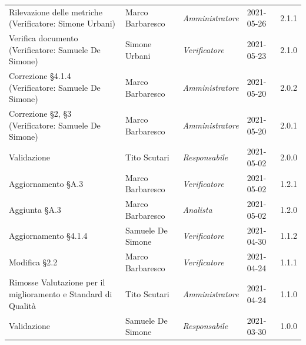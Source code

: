 \documentclass[a4paper]{article}
\begin{document}
\begin{center}
\begin{longtable}[!h]{p{160px} p{80px} p{70px} p{55px} p{40px}}
        Rilevazione delle metriche \newline (Verificatore: Simone Urbani)                         & Marco Barbaresco  & \textit{Amministratore} & 2021-05-26    & 2.1.1             \\
        Verifica documento \newline (Verificatore: Samuele De Simone)                             & Simone Urbani     & \textit{Verificatore}   & 2021-05-23    & 2.1.0             \\
        Correzione \S 4.1.4 \newline (Verificatore: Samuele De Simone)                            & Marco Barbaresco  & \textit{Amministratore} & 2021-05-20    & 2.0.2             \\
        Correzione \S2, \S3 \newline (Verificatore: Samuele De Simone)                            & Marco Barbaresco  & \textit{Amministratore} & 2021-05-20    & 2.0.1             \\
        Validazione                                                                              & Tito Scutari      & \textit{Responsabile}   & 2021-05-02    & 2.0.0             \\
        Aggiornamento \S A.3                                                                     & Marco Barbaresco  & \textit{Verificatore}   & 2021-05-02    & 1.2.1             \\
        Aggiunta \S A.3                                                                          & Marco Barbaresco  & \textit{Analista}       & 2021-05-02    & 1.2.0             \\
        Aggiornamento \S 4.1.4                                                                   & Samuele De Simone & \textit{Verificatore}   & 2021-04-30    & 1.1.2             \\
        Modifica \S 2.2                                                                          & Marco Barbaresco  & \textit{Verificatore}   & 2021-04-24    & 1.1.1             \\
        Rimosse Valutazione per il miglioramento e Standard di Qualità                           & Tito Scutari      & \textit{Amministratore} & 2021-04-24    & 1.1.0             \\
        Validazione                                                                              & Samuele De Simone & \textit{Responsabile}   & 2021-03-30    & 1.0.0             \\

\end{longtable}
\end{center}
\end{document}
